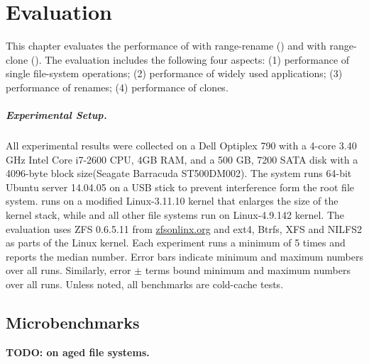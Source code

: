 \chapter{Evaluation}
\label{chap:eval}

This chapter evaluates the performance of \betrfs with
range-rename (\betrfsFour) and \betrfs with range-clone (\betrfsFive).
The evaluation includes the following four aspects:
(1) performance of single file-system operations;
(2) performance of widely used applications;
(3) performance of renames;
(4) performance of clones.

\paragraph{Experimental Setup.}

All experimental results were collected on
a Dell Optiplex 790 with a 4-core 3.40 GHz Intel Core i7-2600 CPU,
4GB RAM,
and a 500 GB, 7200 SATA disk with a 4096-byte block size(Seagate Barracuda ST500DM002).
The system runs 64-bit Ubuntu server 14.04.05 on a USB stick to prevent
interference form the root file system.
\betrfsFour runs on a modified Linux-3.11.10 kernel that enlarges the size of the kernel stack,
while \betrfsFive and all other file systems run on Linux-4.9.142 kernel.
The evaluation uses ZFS 0.6.5.11 from \url{zfsonlinx.org} and
ext4, Btrfs, XFS and NILFS2 as parts of the Linux kernel.
Each experiment runs a minimum of 5 times and reports the median number.
Error bars indicate minimum and maximum numbers over all runs.
Similarly, error $\pm$ terms bound minimum and maximum numbers over all runs.
Unless noted, all benchmarks are cold-cache tests.

\section{Microbenchmarks}

\textbf{TODO: on aged file systems.}

\newcommand{\addSeqPlot}[1]{
    \addplot[
        discard if not={fs}{#1},
        fill=\pgfkeysvalueof{/fs-colors/#1},
        nodes near coords=\pgfkeysvalueof{/fs-names/#1},
    ]
    plot[
        error bars/.cd,
        y dir=both, y explicit,
    ]
    table[
        x=op,
        y=median,
        y error plus expr=\thisrow{max}-\thisrow{median},
        y error minus expr=\thisrow{median}-\thisrow{min},
    ]
    {./data/seq_io.csv};
}

